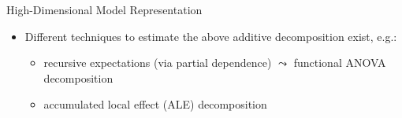 \documentclass[11pt,compress,t,notes=noshow, aspectratio=169, xcolor=table]{beamer}
\newcommand{\open}{\{}
\newcommand{\close}{\}}
\begin{document}
\begin{frame}{High-Dimensional Model Representation  
}
\begin{itemize}
\begin{itemize}
\item $g_{\open  0  \close} \hat = $ Constant mean (intercept) %
\item Univariate terms $g_{\open j \close} \hat = $ first-order or main effect of $j$-th feature w.r.t. $\fh(\xv)$
\item General $|S|$-order effects $g_{S}(x_S)$ depend only on features included in $S$ %
\end{itemize}
\pause
\item Different techniques to estimate the above additive decomposition exist, e.g.:
		\begin{itemize}
			\item recursive expectations (via partial dependence) $\leadsto$ functional ANOVA decomposition
			\item accumulated local effect (ALE) decomposition
		\end{itemize}
\end{itemize}
\end{frame}
\end{document}
